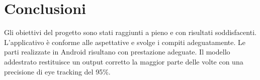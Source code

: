 \documentclass[11pt]{article}
\begin{document}
\newpage
\section{Conclusioni}
Gli obiettivi del progetto sono stati raggiunti a pieno e con risultati soddisfacenti. 
\newline \newline
L’applicativo è
conforme alle aspettative e svolge i compiti adeguatamente.
Le parti realizzate
in Android risultano con prestazione adeguate.
\newline \newline
Il modello addestrato restituisce un output corretto la maggior parte delle volte con una precisione di eye tracking del 95\%.

\newpage

\end{document}
